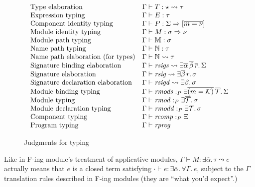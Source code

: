 \documentclass{article}
\begin{document}
\begin{figure}[H]
\[
\begin{array}{ll}
\mbox{Type elaboration} &\Gamma \vdash T : \star \leadsto \tau \\
\mbox{Expression typing} & \Gamma \vdash E : \tau \\
\mbox{Component identity typing} & \Gamma \vdash P : \Sigma \Rightarrow [\overline{m = \nu}] \\
\mbox{Module identity typing} & \Gamma \vdash M : \sigma \Rightarrow \nu \\
\mbox{Module path typing} & \Gamma \vdash \mathbb{M} : \sigma \\
\mbox{Name path typing} & \Gamma \vdash \mathbb{N} : \tau \\
\mbox{Name path elaboration (for types)} & \Gamma \vdash \mathbb{N} \leadsto \tau \\
\mbox{Signature binding elaboration} & \Gamma \vdash \mathit{rsigs} \leadsto \exists \overline{\alpha}\, \overline{\beta}\, \overline{r}.\, \Sigma \\
\mbox{Signature elaboration} & \Gamma \vdash \mathit{rsig} \leadsto \exists \overline{\beta}\, r.\, \sigma \\
\mbox{Signature declaration elaboration} & \Gamma \vdash \mathit{rsigd} \leadsto \exists \beta.\, \mathit{\sigma} \\
\mbox{Module binding typing} & \Gamma \vdash \mathit{rmods} :_P \exists \overline{(m = \mathcal{K})}\, \overline{\mathcal{T}}.\, \Sigma \\
\mbox{Module typing} & \Gamma \vdash \mathit{rmod} :_P \exists \overline{\mathcal{T}}.\, \sigma \\
\mbox{Module declaration typing} & \Gamma \vdash \mathit{rmodd} :_P \exists \mathcal{T}.\, \mathit{\sigma} \\
\mbox{Component typing} & \Gamma \vdash \mathit{rcomp} :_P \Xi \\
\mbox{Program typing} & \Gamma \vdash \mathit{rprog} \\
\end{array}
\]
\caption{Judgments for typing}
\end{figure}

\newcommand{\tyenv}{\Gamma}

\noindent
Like in F-ing module's treatment of applicative modules,
$\Gamma \vdash M : \exists \overline{\alpha}.\, \tau \leadsto e$
actually means that $e$ is a closed term satisfying
$\cdot \vdash e : \exists \overline{\alpha}.\, \forall \tyenv.\, e $,
subject to the $\Gamma$ translation rules described in F-ing modules
(they are ``what you'd expect''.) 
\end{document}

